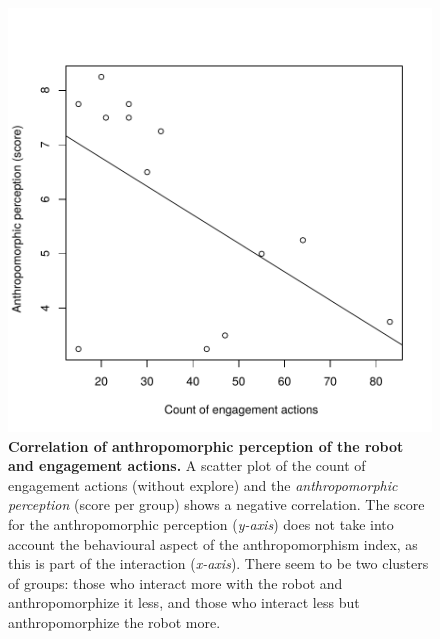 \documentclass{sig-alternate}
\begin{document}
\begin{figure}[t]
    \centering
    \includegraphics[width=0.7\columnwidth]{domino-correlation.pdf}   

    \caption[Correlation of Anthropomorphic Perception of the Robot and
    Interaction]{\small \textbf{Correlation of anthropomorphic perception of the
    robot and engagement actions.} A scatter plot of the count of engagement
    actions (without explore) and the \textit{anthropomorphic perception} (score per
    group) shows a negative correlation. The score for the anthropomorphic
    perception (\textit{y-axis}) does not take into account the behavioural aspect of
    the anthropomorphism index, as this is part of the interaction
    (\textit{x-axis}).  There seem to be two clusters of groups: those who interact
    more with the robot and anthropomorphize it less, and those who interact less
    but anthropomorphize the robot more.}

    \label{fig:domino-anthropo-interaction}
\end{figure}	

\end{document}
